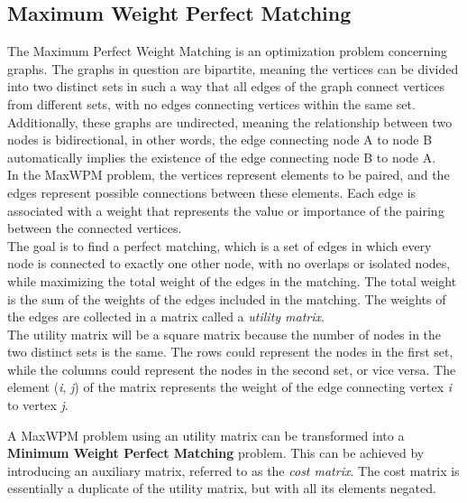\subsection{Maximum Weight Perfect Matching}
\label{sec:MaxWPM}
The Maximum Perfect Weight Matching is an optimization problem concerning graphs.
The graphs in question are bipartite, meaning the vertices can be divided into two distinct sets in such a way that all edges of the graph connect vertices from different sets, with no edges connecting vertices within the same set.
Additionally, these graphs are undirected, meaning the relationship between two nodes is bidirectional, in other words, the edge connecting node A to node B automatically implies the existence of the edge connecting node B to node A. \\
In the MaxWPM problem, the vertices represent elements to be paired, and the edges represent possible connections between these elements. 
Each edge is associated with a weight that represents the value or importance of the pairing between the connected vertices.\\
The goal is to find a perfect matching, which is a set of edges in which every node is connected to exactly one other node, with no overlaps or isolated nodes, while maximizing the total weight of the edges in the matching.
The total weight is the sum of the weights of the edges included in the matching.
The weights of the edges are collected in a matrix called a \textit{utility matrix}.\\
The utility matrix will be a square matrix because the number of nodes in the two distinct sets is the same.
The rows could represent the nodes in the first set, while the columns could represent the nodes in the second set, or vice versa.
The element (\textit{i}, \textit{j}) of the matrix represents the weight of the edge connecting vertex \textit{i} to vertex \textit{j}.

A MaxWPM problem using an utility matrix can be transformed into a \textbf{Minimum Weight Perfect Matching} problem.
This can be achieved by introducing an auxiliary matrix, referred to as the \textit{cost matrix}.
The cost matrix is essentially a duplicate of the utility matrix, but with all its elements negated.

